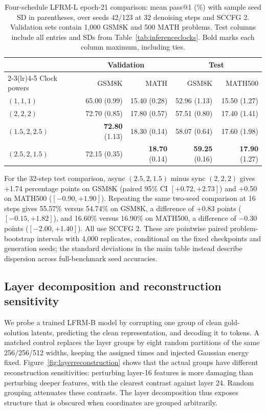 \documentclass{article}
\begin{document}
\begin{table}[htbp]
\centering\small
\caption{Four-schedule LFRM-L epoch-21 comparison: mean pass@1 (\%) with sample seed SD in parentheses, over seeds 42/123 at 32 denoising steps and SCCFG 2. Validation sets contain 1,000 GSM8K and 500 MATH problems. Test columns include all entries and SDs from Table~\ref{tab:inferenceclocks}. Bold marks each column maximum, including ties.}
\label{tab:inferenceclockfull}
\begin{tabular}{lrrrr}
\toprule
& \multicolumn{2}{c}{Validation} & \multicolumn{2}{c}{Test} \\
\cmidrule(lr){2-3}\cmidrule(lr){4-5}
Clock powers & GSM8K & MATH & GSM8K & MATH500 \\
\midrule
$(1,1,1)$ & 65.00 {\scriptsize (0.99)} & 15.40 {\scriptsize (0.28)} & 52.96 {\scriptsize (1.13)} & 15.50 {\scriptsize (1.27)} \\
$(2,2,2)$ & 72.70 {\scriptsize (0.85)} & 17.80 {\scriptsize (0.57)} & 57.51 {\scriptsize (0.80)} & 17.40 {\scriptsize (1.41)} \\
$(1.5,2,2.5)$ & \textbf{72.80} {\scriptsize (1.13)} & 18.30 {\scriptsize (0.14)} & 58.07 {\scriptsize (0.64)} & 17.60 {\scriptsize (1.98)} \\
$(2.5,2,1.5)$ & 72.15 {\scriptsize (0.35)} & \textbf{18.70} {\scriptsize (0.14)} & \textbf{59.25} {\scriptsize (0.16)} & \textbf{17.90} {\scriptsize (1.27)} \\
\bottomrule
\end{tabular}
\end{table}

For the 32-step test comparison, async $(2.5,2,1.5)$ minus sync $(2,2,2)$ gives +1.74 percentage points on GSM8K (paired 95\% CI $[+0.72,+2.73]$) and +0.50 on MATH500 ($[-0.90,+1.90]$). Repeating the same two-seed comparison at 16 steps gives 55.57\% versus 54.74\% on GSM8K, a difference of +0.83 points ($[-0.15,+1.82]$), and 16.60\% versus 16.90\% on MATH500, a difference of $-0.30$ points ($[-2.00,+1.40]$). All use SCCFG 2. These are pointwise paired problem-bootstrap intervals with 4,000 replicates, conditional on the fixed checkpoints and generation seeds; the standard deviations in the main table instead describe dispersion across full-benchmark seed accuracies.

\subsection{Layer decomposition and reconstruction sensitivity}
We probe a trained LFRM-B model by corrupting one group of clean gold-solution latents, predicting the clean representation, and decoding it to tokens. A matched control replaces the layer groups by eight random partitions of the same 256/256/512 widths, keeping the assigned times and injected Gaussian energy fixed. Figure~\ref{fig:layerreconstruction} shows that the actual groups have different reconstruction sensitivities: perturbing layer-16 features is more damaging than perturbing deeper features, with the clearest contrast against layer 24. Random grouping attenuates these contrasts. The layer decomposition thus exposes structure that is obscured when coordinates are grouped arbitrarily.
\end{document}
